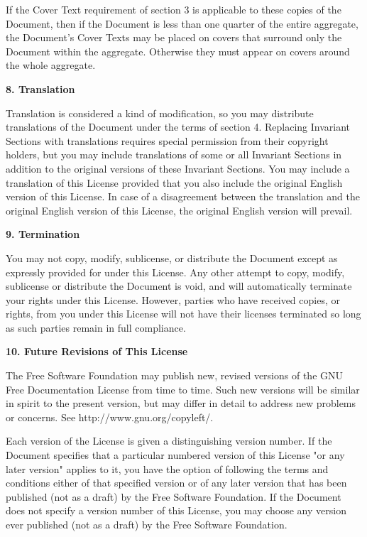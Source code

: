 \documentclass{doc}
\begin{document}
If the Cover Text requirement of section 3 is applicable to these
copies of the Document, then if the Document is less than one quarter
of the entire aggregate, the Document's Cover Texts may be placed on
covers that surround only the Document within the aggregate.
Otherwise they must appear on covers around the whole aggregate.


\noindent\textbf{8. Translation}

Translation is considered a kind of modification, so you may
distribute translations of the Document under the terms of section 4.
Replacing Invariant Sections with translations requires special
permission from their copyright holders, but you may include
translations of some or all Invariant Sections in addition to the
original versions of these Invariant Sections.  You may include a
translation of this License provided that you also include the
original English version of this License.  In case of a disagreement
between the translation and the original English version of this
License, the original English version will prevail.


\noindent\textbf{9. Termination}

You may not copy, modify, sublicense, or distribute the Document except
as expressly provided for under this License.  Any other attempt to
copy, modify, sublicense or distribute the Document is void, and will
automatically terminate your rights under this License.  However,
parties who have received copies, or rights, from you under this
License will not have their licenses terminated so long as such
parties remain in full compliance.


\noindent\textbf{10. Future Revisions of This License}

The Free Software Foundation may publish new, revised versions
of the GNU Free Documentation License from time to time.  Such new
versions will be similar in spirit to the present version, but may
differ in detail to address new problems or concerns. See
http://www.gnu.org/copyleft/.

Each version of the License is given a distinguishing version number.
If the Document specifies that a particular numbered version of this
License "or any later version" applies to it, you have the option of
following the terms and conditions either of that specified version or
of any later version that has been published (not as a draft) by the
Free Software Foundation.  If the Document does not specify a version
number of this License, you may choose any version ever published (not
as a draft) by the Free Software Foundation.
\end{document}
